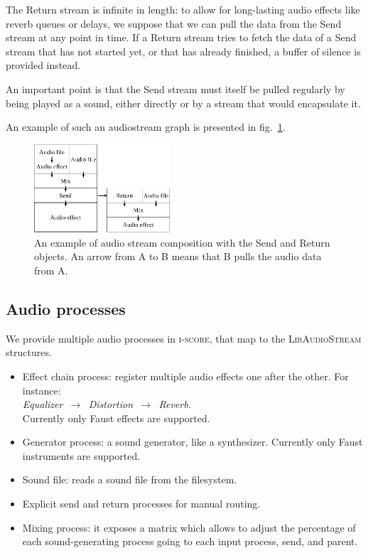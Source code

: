 \documentclass{article}
\newcommand*{\LibAudioStream}{\textsc{LibAudioStream}\xspace}
\newcommand*{\iscore}{\textsc{i-score}\xspace}
\begin{document}
The Return stream is infinite in length: to allow for long-lasting audio effects 
like reverb queues or delays, we suppose that we can pull the data from the Send stream at any point in time.
If a Return stream tries to fetch the data of a Send stream that has not started yet, or that has already finished, a buffer of silence is provided instead.

An important point is that the Send stream must itself be pulled regularly by being played as a sound, either directly or by a stream that would encapsulate it.

An example of such an audiostream graph is presented in fig.~\ref{fig.mixsendreturn}.

\begin{figure}[h]
	\centering
	\includegraphics[width=0.45\textwidth]{figures/graph2.eps}
	\caption{An example of audio stream composition with the Send and Return objects. An arrow from A to B means that B pulls the audio data from A.}
	\label{fig.mixsendreturn}
\end{figure}

\subsection{Audio processes}
\label{sec.processes}
We provide multiple audio processes in \iscore, that map 
to the \LibAudioStream structures.

\begin{itemize}
	\item Effect chain process: register multiple audio effects one after the other. 
	For instance:~\\ \emph{ Equalizer $\,\to\,$ Distortion $\,\to\,$ Reverb}. ~\\
	Currently only Faust effects are supported.
	\item Generator process: a sound generator, like a synthesizer. 
	Currently only Faust instruments are supported.
	\item Sound file: reads a sound file from the filesystem.
	\item Explicit send and return processes for manual routing.
	\item Mixing process: it exposes a matrix which allows to adjust the percentage of each sound-generating process going to each input process, send, and parent.
\end{itemize}
\end{document}
